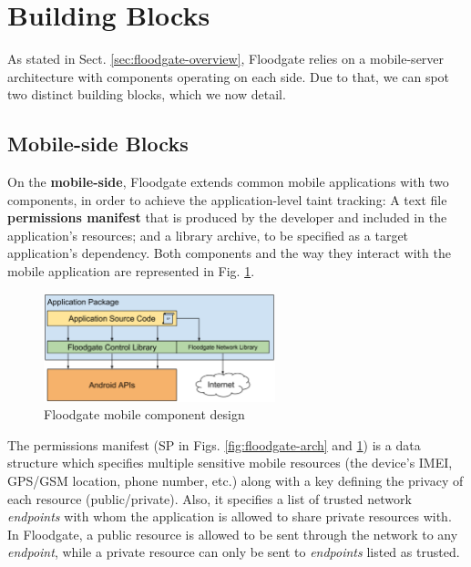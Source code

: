 \section{Building Blocks}
\label{sec:building-blocks}

As stated in Sect. \ref{sec:floodgate-overview}, Floodgate relies on a mobile-server architecture with components operating on each side. Due to that, we can spot two distinct building blocks, which we now detail.

\subsection{Mobile-side Blocks}
\label{sec:mobile-side-blocks}

On the \textbf{mobile-side}, Floodgate extends common mobile applications with two components, in order to achieve the application-level taint tracking: A text file \textbf{permissions manifest} that is produced by the developer and included in the application's resources; and a library archive, to be specified as a target application's dependency. Both components and the way they interact with the mobile application are represented in Fig. \ref{fig:floodgate-mobile-blocks}.

\begin{figure}[t!]
\includegraphics[width=0.6\textwidth]{figs/floodgate-mobile-blocks}
\centering
\caption{Floodgate mobile component design}
\label{fig:floodgate-mobile-blocks}
\end{figure}

The permissions manifest (SP in Figs. \ref{fig:floodgate-arch} and \ref{fig:floodgate-mobile-blocks}) is a data structure which specifies multiple sensitive mobile resources (the device's IMEI, GPS/GSM location, phone number, etc.) along with a key defining the privacy of each resource (public/private). Also, it specifies a list of trusted network \textit{endpoints} with whom the application is allowed to share private resources with. In Floodgate, a public resource is allowed to be sent through the network to any \textit{endpoint}, while a private resource can only be sent to \textit{endpoints} listed as trusted.

